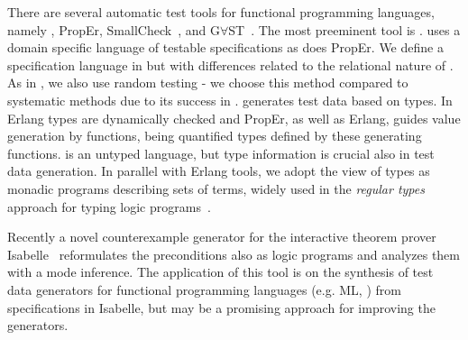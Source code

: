 There are several automatic test tools for functional programming
languages, namely \QuickCheck, {\sf PropEr}, {\sf SmallCheck}~\cite{runciman2008smallcheck},
and G$\forall$ST~\cite{koopman2003gast}.
The %
most preeminent tool is \QuickCheck{}.
%
\QuickCheck{} uses a domain specific language of testable specifications
as does {\sf PropEr}.
%
We define a specification language in \plqc{} but with
differences related to the relational nature of \Prolog{}.%
As in \QuickCheck{}, we also use random testing - we choose this method
compared to systematic methods due to its success in \QuickCheck{}.
%
\QuickCheck{} generates test data %
based
on \Haskell{} types.
In {\sf Erlang} types are dynamically checked and {\sf PropEr}, as well
as {\sf Erlang}\QuickCheck{}, guides value generation by functions,
being quantified types defined by these generating functions.
%
\Prolog{} is an untyped language, but type information is crucial also in
\plqc{} test data generation.
%
In parallel with {\sf Erlang} tools, we adopt the view of types as
monadic \Prolog{} programs describing sets of terms, widely used in the
{\em regular types} approach for typing logic programs~\cite{Yardeni:1991:TSL:110703.110705,fruhwirth1991logic,DBLP:conf/iclp/Zobel87,florido1992types}.


Recently a novel counterexample generator for the interactive theorem
prover Isabelle~\cite{bulwahn2012smart} reformulates the preconditions
also as logic programs and analyzes them with a mode inference.
%
The application of this tool is on the  synthesis of test data
generators for functional programming languages (e.g. ML, \Haskell) from
specifications in Isabelle, %
but may be a promising approach for improving the generators.

